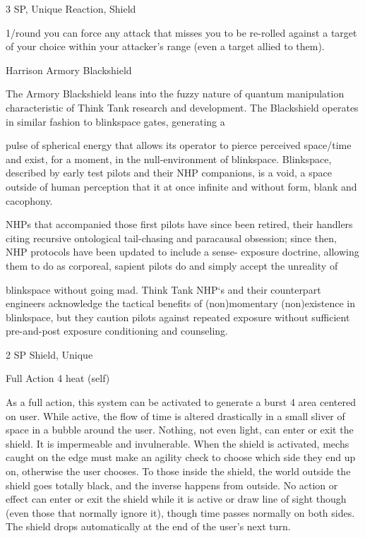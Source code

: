 3 SP, Unique
Reaction, Shield

1/round you can force any attack that misses you to be re-rolled against a target of your choice
within your attacker’s range (even a target allied to them).


Harrison Armory Blackshield

The Armory Blackshield leans into the fuzzy nature of quantum manipulation characteristic of Think Tank
research and development. The Blackshield operates in similar fashion to blinkspace gates, generating a

pulse of spherical energy that allows its operator to pierce perceived space/time and exist, for a moment, in
the null-environment of blinkspace. Blinkspace, described by early test pilots and their NHP companions, is
a void, a space outside of human perception that it at once infinite and without form, blank and cacophony.

NHPs that accompanied those first pilots have since been retired, their handlers citing recursive ontological
tail-chasing and paracausal obsession; since then, NHP protocols have been updated to include a sense-
exposure doctrine, allowing them to do as corporeal, sapient pilots do and simply accept the unreality of

blinkspace without going mad. Think Tank NHP‘s and their counterpart engineers acknowledge the tactical
benefits of (non)momentary (non)existence in blinkspace, but they caution pilots against repeated exposure
without sufficient pre-and-post exposure conditioning and counseling.

2 SP
Shield, Unique

Full Action
4 heat (self)

As a full action, this system can be activated to generate a burst 4 area centered on user. While
active, the flow of time is altered drastically in a small sliver of space in a bubble around the user.
Nothing, not even light, can enter or exit the shield. It is impermeable and invulnerable. When the
shield is activated, mechs caught on the edge must make an agility check to choose which side
they end up on, otherwise the user chooses. To those inside the shield, the world outside the
shield goes totally black, and the inverse happens from outside. No action or effect can enter or
exit the shield while it is active or draw line of sight though (even those that normally ignore it),
though time passes normally on both sides. The shield drops automatically at the end of the
user’s next turn.


